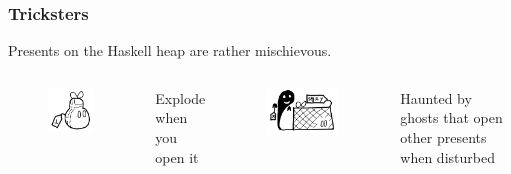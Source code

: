 \documentclass{beamer}
\begin{document}
\begin{frame}
\frametitle{Tricksters}
Presents on the Haskell heap are rather mischievous.\newline

\begin{columns}
\begin{figure}[hbt!]
    \includegraphics[height=0.3\textheight]{./pic/thunk-bomb.png}
\end{figure}
\begin{center}
Explode when you open it
\end{center}

\begin{figure}[hbt!]
    \includegraphics[height=0.3\textheight]{./pic/thunk-ghost.png}
\end{figure}
\begin{center}
Haunted by ghosts that open other presents when disturbed
\end{center}
\end{columns}
\end{frame}

\end{document}
